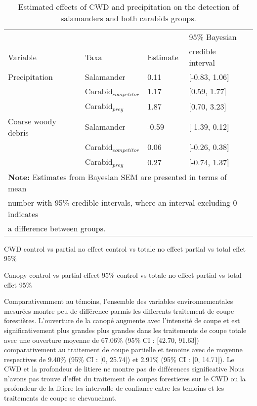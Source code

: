 \begin{table}[ht!]
  \centering
  \caption[Estimated effects of CWD and precipitation on the detection of salamanders and both carabids groups.]
  {Estimated effects of CWD and precipitation on the detection of salamanders and both carabids groups.}
  \label{tab:detection}
  \begin{tabular}{lllll} 
      \hline
      &&&95\% Bayesian \\
      Variable & Taxa & Estimate &  credible interval \\ [0.5ex] 
      \hline      
      Precipitation       & Salamander              & \hspace{1mm}0.11 & [-0.83, 1.06] \\ 
                          & Carabid$_{competitor}$  & \hspace{1mm}1.17 & [0.59, 1.77] \\ 
                          & Carabid$_{prey}$        & \hspace{1mm}1.87 & [0.70, 3.23] \\       
      Coarse woody debris & Salamander              & -0.59 & [-1.39, 0.12] \\ 
                          & Carabid$_{competitor}$  & \hspace{1mm}0.06 & [-0.26, 0.38] \\ 
                          & Carabid$_{prey}$        & \hspace{1mm}0.27 & [-0.74, 1.37] \\   

      \hline
      \multicolumn{4}{l}{\textbf{Note:} Estimates from Bayesian SEM are presented in terms of mean} \\
      \multicolumn{4}{l}{number with 95\% credible intervals, where an interval excluding 0 indicates} \\
      \multicolumn{4}{l}{a difference between groups.} \\
  \end{tabular}
\end{table}



CWD
control vs partial  no effect
control vs totale  no effect
partial vs total  effet 95\% 

Canopy
control vs partial  effect 95\%
control vs totale  no effect
partial vs total  effet 95\% 


Comparativemment au témoins, l'ensemble des variables environnementales mesurées montre peu de différence parmis les differents traitement de coupe forestières.
L'ouverture de la canopé augmente avec l'intensité de coupe et est significativement plus grandes plus grandes dans les traitements de coupe totale avec une ouverture moyenne 
de 67.06\% (95\% CI : [42.70, 91.63]) comparativement au traitement de coupe partielle et temoins avec de moyenne respectives de 9.40\% (95\% CI : [0, 25.74]) et 2.91\% (95\% CI : [0, 14.71]). 
Le CWD et la profondeur de litiere ne montre pas de différences significative 
Nous n'avons pas trouve d'effet du traitement de coupes forestieres sur le CWD ou la profondeur de la litiere les intervalle de confiance entre les temoins et 
les traitements de coupe se chevauchant.

